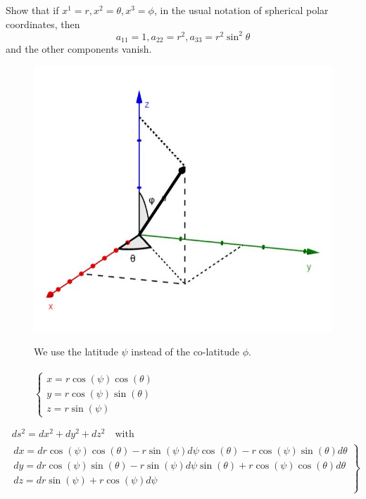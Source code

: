 \begin{tcolorbox}
Show that if $x^1 = r, x^2 = \theta, x^3 = \phi$, in the usual notation of spherical polar coordinates, then $$ a_{11} =1, a_{22} = r^2, a_{33} = r^2\sin^2\theta$$ and the other components vanish.
\end{tcolorbox}
\begin{figure}[h]
\centering
\begin{minipage}[t]{.5\textwidth}
\vspace{0pt}
\includegraphics[scale=.5]{spherical.jpg}
\end{minipage}\hfill
\begin{minipage}[t]{0.4\textwidth}
\vspace{50pt}
We use the latitude $\psi$ instead of the co-latitude $\phi$.\\\\
$\left\{ \begin{array}{c}
    x= r\cos (\psi )\cos (\theta) \\
     y= r\cos (\psi )\sin (\theta) \\
      z= r\sin(\psi )
  \end{array} \right.$
\end{minipage}
\end{figure}
\begin{align} 
\ ds^2 = dx^2 + dy^2 + dz^2\quad\text{with}\\
\left.
\begin{array}{c}
    dx= dr\cos (\psi )\cos (\theta)- r\sin (\psi )d\psi\cos (\theta) -r\cos (\psi )\sin (\theta)d\theta\\
     dy= dr\cos (\psi )\sin (\theta) -r\sin (\psi )d\psi\sin (\theta)+r\cos (\psi )\cos (\theta)d\theta\\
      dz= dr\sin(\psi )+r\cos(\psi )d\psi\\
  \end{array} \right\}
  \end{align}

